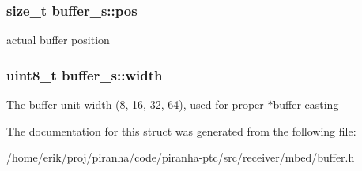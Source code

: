 \subsubsection[{\texorpdfstring{pos}{pos}}]{\setlength{\rightskip}{0pt plus 5cm}size\+\_\+t buffer\+\_\+s\+::pos}\hypertarget{structbuffer__s_a7b83c0750f3dc1aa729e2bafaaef3851}{}\label{structbuffer__s_a7b83c0750f3dc1aa729e2bafaaef3851}
actual buffer position 
\subsubsection[{\texorpdfstring{width}{width}}]{\setlength{\rightskip}{0pt plus 5cm}uint8\+\_\+t buffer\+\_\+s\+::width}\hypertarget{structbuffer__s_ade001f85e94113a6781eb6e09731bf09}{}\label{structbuffer__s_ade001f85e94113a6781eb6e09731bf09}
The buffer unit width (8, 16, 32, 64), used for proper $\ast$buffer casting 

The documentation for this struct was generated from the following file\+:\begin{DoxyCompactItemize}
\item 
/home/erik/proj/piranha/code/piranha-\/ptc/src/receiver/mbed/buffer.\+h\end{DoxyCompactItemize}
